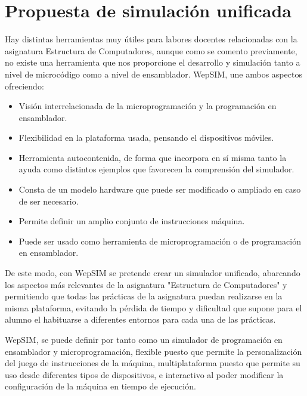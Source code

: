\clearpage

\section{Propuesta de simulación unificada}
\label{sec:propuesta_simulacion}
Hay distintas herramientas muy útiles para labores docentes relacionadas con la asignatura Estructura de Computadores, aunque como se comento previamente, no existe una herramienta que nos proporcione el desarrollo y simulación tanto a nivel de microcódigo como a nivel de ensamblador. WepSIM, une ambos aspectos ofreciendo:

\begin{itemize}
	\item Visión interrelacionada de la microprogramación y la programación en ensamblador.
	\item Flexibilidad en la plataforma usada, pensando el dispositivos móviles.
	\item Herramienta autocontenida, de forma que incorpora en sí misma tanto la ayuda como distintos ejemplos que favorecen la comprensión del simulador.
	\item Consta de un modelo hardware que puede ser modificado o ampliado en caso de ser necesario.
	\item Permite definir un amplio conjunto de instrucciones máquina.
	\item Puede ser usado como herramienta de microprogramación o de programación en ensamblador.
\end{itemize}

De este modo, con WepSIM se pretende crear un simulador unificado, abarcando los aspectos más relevantes de la asignatura "Estructura de Computadores" y permitiendo que todas las prácticas de la asignatura puedan realizarse en la misma plataforma, evitando la pérdida de tiempo y dificultad que supone para el alumno el habituarse a diferentes entornos para cada una de las prácticas.

WepSIM, se puede definir por tanto como un simulador de programación en ensamblador y microprogramación, flexible puesto que permite la personalización del juego de instrucciones de la máquina, multiplataforma puesto que permite su uso desde diferentes tipos de dispositivos, e interactivo al poder modificar la configuración de la máquina en tiempo de ejecución.

